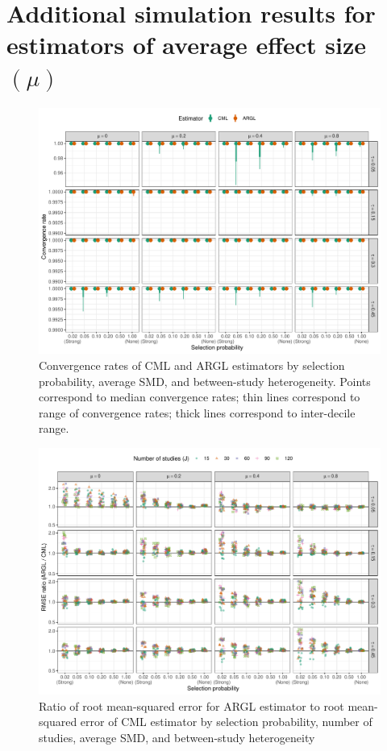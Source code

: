 \documentclass[
  american,
  man, donotrepeattitle,mask,floatsintext]{apa7}
\numberwithin{table}{section}
\numberwithin{equation}{section}
\numberwithin{figure}{section}
\begin{document}
\newpage

\section{\texorpdfstring{Additional simulation results for estimators of average effect size \((\mu)\)}{Additional simulation results for estimators of average effect size (\textbackslash mu)}}\label{mu-simulation-results}

\begin{figure}
\includegraphics{step-function-selection-models-supplementary-materials_files/figure-latex/convergence-rates-1} \caption{Convergence rates of CML and ARGL estimators by selection probability, average SMD, and between-study heterogeneity. Points correspond to median convergence rates; thin lines correspond to range of convergence rates; thick lines correspond to inter-decile range.}\label{fig:convergence-rates}
\end{figure}

\begin{figure}
\includegraphics{step-function-selection-models-supplementary-materials_files/figure-latex/rmse-ARGL-CML-1} \caption{Ratio of root mean-squared error for ARGL estimator to root mean-squared error of CML estimator by selection probability, number of studies, average SMD, and between-study heterogeneity}\label{fig:rmse-ARGL-CML}
\end{figure}
\end{document}
